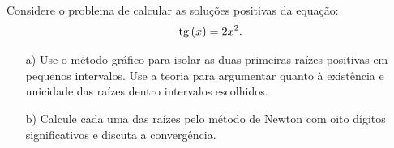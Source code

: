 \begin{exer} Considere o problema de calcular as soluções positivas da equação:
  \begin{equation}
    \operatorname{tg}\,(x)=2x^2.
  \end{equation}
\begin{itemize}
\item[a)] Use o método gráfico para isolar as duas primeiras raízes positivas em pequenos intervalos. Use a teoria para argumentar quanto à existência e unicidade das raízes dentro intervalos escolhidos.
\item[b)]  Calcule cada uma das raízes pelo método de Newton com oito dígitos significativos e discuta a convergência.%
\end{itemize}
\end{exer}
\ifisscilab

